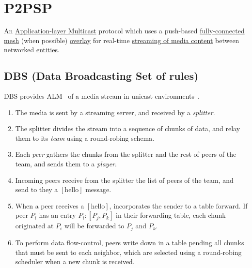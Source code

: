 \section{P2PSP}
An \href{https://en.wikipedia.org/wiki/Multicast}{Application-layer Multicast} protocol which uses a push-based \href{https://en.wikipedia.org/wiki/Network_topology}{fully-connected mesh} (when possible) \href{https://en.wikipedia.org/wiki/Overlay_network}{overlay} for real-time \href{(https://en.wikipedia.org/wiki/Streaming_media}{streaming of media content} between networked \href{https://en.wikipedia.org/wiki/Process_%28computing%29}{entities}.

\begin{center}
\end{center}

\subsection{DBS (Data Broadcasting Set of rules)}
DBS provides ALM~\cite{banerjee2002scalable} of a media stream in
unicast environments~\cite{comer2003computer}.
\begin{enumerate}
  \item The media is sent by a streaming server, and received by a
    \emph{splitter}.
  \item The splitter divides the stream into a sequence of chunks of
    data, and relay them to its \emph{team} using a round-robing
    schema.
  \item Each \emph{peer} gathers the chunks from the splitter and the
    rest of peers of the team, and sends them to a \emph{player}.
  \item Incoming peers receive from the splitter the list of peers of
    the team, and send to they a $[\text{hello}]$ message.
  \item When a peer receives a $[\text{hello}]$, incorporates the
    sender to a table $\text{forward}$. If peer $P_i$ has an entry
    $P_i: [P_j, P_k]$ in their forwarding table, each chunk originated
    at $P_i$ will be forwarded to $P_j$ and $P_k$.
  \item To perform data flow-control, peers write down in a table
    $\text{pending}$ all chunks that must be sent to each neighbor,
    which are selected using a round-robing scheduler when a new chunk
    is received.
\end{enumerate}

